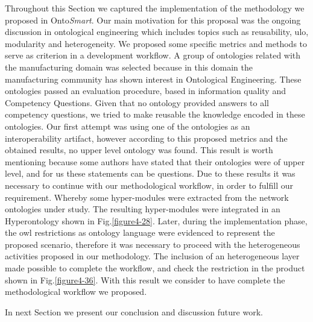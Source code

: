 Throughout this Section we captured the implementation of the methodology we proposed in Onto\textit{Smart}. Our main motivation for this proposal was the ongoing discussion in ontological engineering which includes topics such as reusability, \gls{ulo}, modularity and heterogeneity. We proposed some specific metrics and methods to serve as criterion in a development workflow. A group of ontologies related with the manufacturing domain was selected because in this domain the manufacturing community has shown interest in Ontological Engineering.  These ontologies passed an evaluation procedure, based in information quality and Competency Questions. Given that no ontology provided answers to all competency questions, we tried to make reusable the knowledge encoded in these ontologies. Our first attempt was using one of the ontologies as an interoperability artifact, however according to this proposed metrics and the obtained results, no upper level ontology was found. This result is worth mentioning because some authors have stated that their ontologies were of upper level, and for us these statements can be questions. Due to these results it was necessary to continue with our methodological workflow, in order to  fulfill our requirement. Whereby some hyper-modules were extracted from the network ontologies under study. The resulting hyper-modules were integrated in an Hyperontology shown in Fig.\ref{figure4-28}. Later, during the implementation phase, the \gls{owl} restrictions as ontology language were evidenced to represent the proposed scenario, therefore it was necessary to proceed with the heterogeneous activities proposed in our methodology. The inclusion of an heterogeneous layer made possible to complete the workflow, and check the restriction in the product shown in Fig.\ref{figure4-36}. With this result we consider to have complete the methodological workflow we proposed.

In next Section we present our conclusion and discussion future work.














